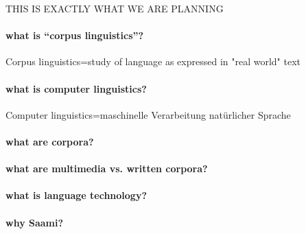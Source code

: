 \documentclass[a4paper,12pt]{article}
\begin{document}
THIS IS EXACTLY WHAT WE ARE PLANNING

\paragraph{what is “corpus linguistics”?} Corpus linguistics=study of language as expressed in "real world" text

\paragraph{what is computer linguistics?} Computer linguistics=maschinelle Verarbeitung natürlicher Sprache

\paragraph{what are corpora?}

\paragraph{what are multimedia vs. written corpora?}

\paragraph{what is language technology?}

\paragraph{why Saami?}
\end{document}
